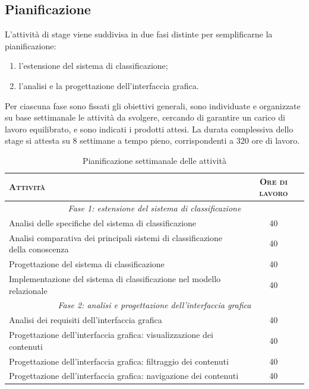 \subsection{Pianificazione}
L'attività di stage viene suddivisa in due fasi distinte per semplificarne la pianificazione:
\begin{enumerate}
\item l'estensione del sistema di classificazione;
\item l'analisi e la progettazione dell'interfaccia grafica.
\end{enumerate}

Per ciascuna fase sono fissati gli obiettivi generali, sono individuate e organizzate su base settimanale le attività da svolgere, cercando di garantire un carico di lavoro equilibrato, e sono indicati i prodotti attesi. La durata complessiva dello stage si attesta su 8 settimane a tempo pieno, corrispondenti a 320 ore di lavoro.

\begin{table}[ht]
\centering
\begin{tabular}{|p{10cm}|c|}
\hline
\textsc{Attività} & \textsc{Ore di lavoro} \\ \hline
\multicolumn{2}{|c|}{\textit{Fase 1: estensione del sistema di classificazione}} \\ \hline 
Analisi delle specifiche del sistema di classificazione & 40 \\ \hline
Analisi comparativa dei principali sistemi di classificazione della conoscenza & 40 \\ \hline
Progettazione del sistema di classificazione & 40 \\ \hline
Implementazione del sistema di classificazione nel modello relazionale & 40 \\ \hline
\multicolumn{2}{|c|}{\textit{Fase 2: analisi e progettazione dell'interfaccia grafica}} \\ \hline 
Analisi dei requisiti dell'interfaccia grafica & 40 \\ \hline
Progettazione dell'interfaccia grafica: visualizzazione dei contenuti & 40 \\ \hline
Progettazione dell'interfaccia grafica: filtraggio dei contenuti & 40 \\ \hline
Progettazione dell'interfaccia grafica: navigazione dei contenuti & 40 \\ \hline
\end{tabular}
\caption{Pianificazione settimanale delle attività}
\label{tab:tesi:stage:pianificazione}
\end{table}


